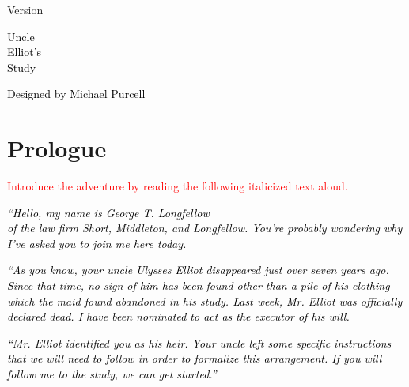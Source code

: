 \documentclass[a6paper, parskip=half, DIV=14, 12pt]{scrartcl}
\begin{document}
{%
\thispagestyle{empty}
		\enlargethispage{3.5\baselineskip} %

\begin{center}
\makeatletter
{\footnotesize Version \@version}
\makeatother
\end{center}

\vfill

\begin{center}
{
\setmainfont[Scale=2]{Special Elite}
\Huge
\textcolor{black}{Uncle\\[0.75ex]Elliot's\\[0.75ex]Study}
}
\end{center}


\vfill{}

\begin{center}
{
\setmainfont{Bilbo Swash Caps}
\LARGE
\textcolor{black}{Designed by Michael Purcell}
}
\end{center}
}


\newpage

\section*{Prologue}


\textcolor{Red}{Introduce the adventure by reading the following italicized text aloud.}

\textcolor{black}{\textit{``Hello, my name is George T. Longfellow\\of the law firm Short, Middleton, and Longfellow. You're probably wondering why I've asked you to join me here today.}}

\textcolor{black}{\textit{``As you know, your uncle Ulysses Elliot disappeared just over seven years ago. Since that time, no sign of him has been found other than a pile of his clothing which the maid found abandoned in his study. Last week, Mr. Elliot was officially declared dead. I have been nominated to act as the executor of his will.}}

\textcolor{black}{\textit{``Mr. Elliot identified you as his heir. Your uncle left some specific instructions that we will need to follow in order to formalize this arrangement. If you will follow me to the study, we can get started.''}}

\newpage
\end{document}
